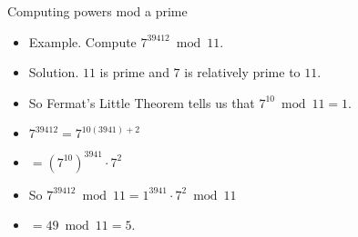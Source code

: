 \documentclass{beamer}
\begin{document}
\begin{frame}{Computing powers mod a prime}

\begin{itemize}
  \item Example. Compute $7^{39412} \bmod 11$.
  \item Solution. $11$ is prime and $7$ is relatively prime to $11$.
  \item So Fermat's Little Theorem tells us that $7^{10} \bmod 11 = 1$.
  \item $7^{39412} = 7^{10(3941) + 2}$
  \item $=\left(7^{10}\right)^{3941}\cdot 7^2$
  \item So $7^{39412} \bmod 11 = 1^{3941}\cdot 7^2 \bmod 11$
  \item $=49 \bmod 11 = 5$.
\end{itemize}

\end{frame}
\end{document}
